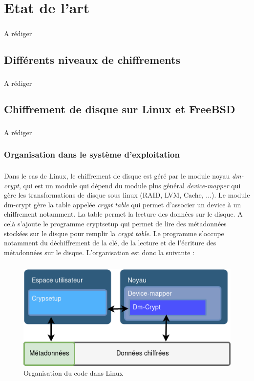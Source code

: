 \chapter{Etat de l'art}
\paragraph*{} A rédiger
\section{Différents niveaux de chiffrements}
\paragraph*{} A rédiger
\section{Chiffrement de disque sur Linux et FreeBSD}
\paragraph*{} A rédiger
\subsection{Organisation dans le système d'exploitation}
\paragraph{}
Dans le cas de Linux, le chiffrement de disque est géré par le module noyau
{\em dm-crypt}, qui est un module qui dépend du module plus général
{\em device-mapper} qui gère les transformations de disque sous linux (RAID, 
LVM, Cache, ...). Le module dm-crypt gère la table appelée {\em crypt table}
qui permet d'associer un device à un chiffrement notamment. La table permet
la lecture des données sur le disque. A celà s'ajoute le programme cryptsetup
qui permet de lire des métadonnées stockées sur le disque pour remplir la {\em
crypt table}. Le programme s'occupe notamment du déchiffrement de la clé, de 
la lecture et de l'écriture des métadonnées sur le disque. L'organisation est 
donc la suivante :

\paragraph{}
\begin{figure}[h]
\centering
\includegraphics[width=.8\linewidth]{etat_art/organisation_linux.png}
\caption{\label{fig:OrgLinux}Organisation du code dans Linux}
\end{figure}

